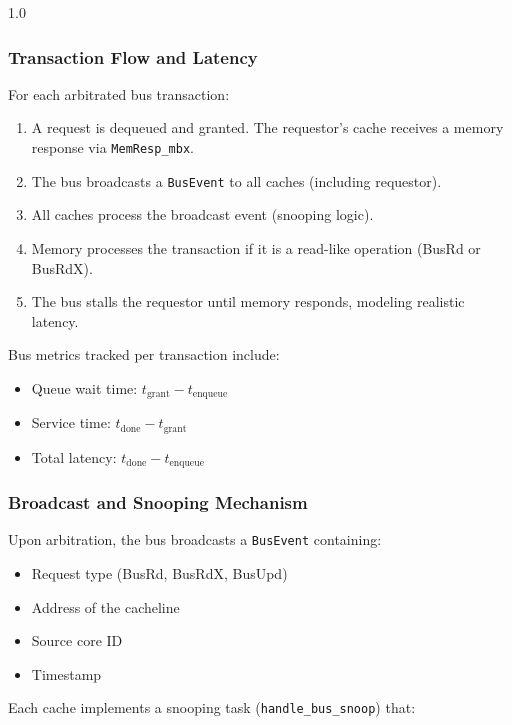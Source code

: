 \documentclass[12pt]{article}
\begin{document}
\begin{spacing}{1.0}
\subsubsection{Transaction Flow and Latency}

For each arbitrated bus transaction:

\begin{enumerate}
    \item A request is dequeued and granted. The requestor's cache receives a memory response via \texttt{MemResp\_mbx}.
    \item The bus broadcasts a \texttt{BusEvent} to all caches (including requestor).
    \item All caches process the broadcast event (snooping logic).
    \item Memory processes the transaction if it is a read-like operation (BusRd or BusRdX).
    \item The bus stalls the requestor until memory responds, modeling realistic latency.
\end{enumerate}

Bus metrics tracked per transaction include:

\begin{itemize}
    \item Queue wait time: $t_{\text{grant}} - t_{\text{enqueue}}$
    \item Service time: $t_{\text{done}} - t_{\text{grant}}$
    \item Total latency: $t_{\text{done}} - t_{\text{enqueue}}$
\end{itemize}

\subsubsection{Broadcast and Snooping Mechanism}

Upon arbitration, the bus broadcasts a \texttt{BusEvent} containing:

\begin{itemize}
    \item Request type (BusRd, BusRdX, BusUpd)
    \item Address of the cacheline
    \item Source core ID
    \item Timestamp
\end{itemize}

Each cache implements a snooping task (\texttt{handle\_bus\_snoop}) that:


\end{spacing}
\end{document}
